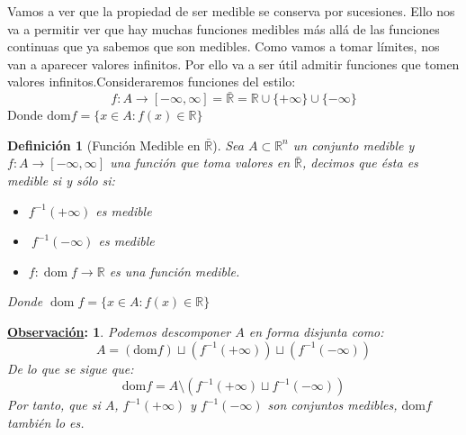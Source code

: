 \documentclass[10pt,a4paper,openright]{book}
\theoremstyle{break}
\newtheorem*{defi}{Definición}
\newtheorem*{obs}{\underline{Observación}:}
\DeclareMathOperator{\dom}{dom}
\begin{document}
Vamos a ver que la propiedad de ser medible se conserva por sucesiones. Ello nos va a permitir ver que hay muchas funciones medibles
más allá de las funciones continuas que ya sabemos que son medibles.
Como vamos a tomar límites, nos van a aparecer valores infinitos. Por
ello va a ser útil admitir funciones que tomen valores infinitos.Consideraremos funciones del estilo:
$$f: A \rightarrow \left[-\infty, \infty\right] = \bar{\mathbb{R}} = \mathbb{R} \cup \{+\infty\} \cup \{-\infty\}$$
Donde $\mathrm{dom}f = \{x \in A: f\left(x\right) \in \mathbb{R}\}$

\begin{defi}[Función Medible en $\bar{\mathbb{R}}$]
Sea $A \subset \mathbb{R}^n$ un conjunto medible y $f: A \rightarrow \left[-\infty, \infty\right]$ una función que toma valores en $\bar{\mathbb{R}}$, decimos que ésta es medible si y sólo si:
\begin{itemize}
\item $f^{-1}\left(+\infty\right)$ es medible
\item $\ f^{-1}\left(-\infty\right)$ es medible
\item $f : \dom f  \rightarrow \mathbb{R}$ es una función medible.
\end{itemize}
Donde $\dom f = \{x\in A: f(x)\in \mathbb{R}\}$
\end{defi}

\begin{obs}
Podemos descomponer $A$ en forma disjunta como:
$$A = \left( \mathrm{dom}f \right) \sqcup \left( f^{-1}\left(+\infty\right)\right) \sqcup \left( f^{-1}\left(-\infty\right)\right) $$
De lo que se sigue que:
$$\mathrm{dom}f = A \setminus \left(  f^{-1}\left(+\infty\right) \sqcup  f^{-1}\left(-\infty \right) \right)$$
Por tanto, que si $A$, $f^{-1}\left(+\infty\right)$ y $f^{-1}\left(-\infty\right)$ son conjuntos medibles, $\mathrm{dom}f$ también lo es.
\end{obs}
\end{document}
